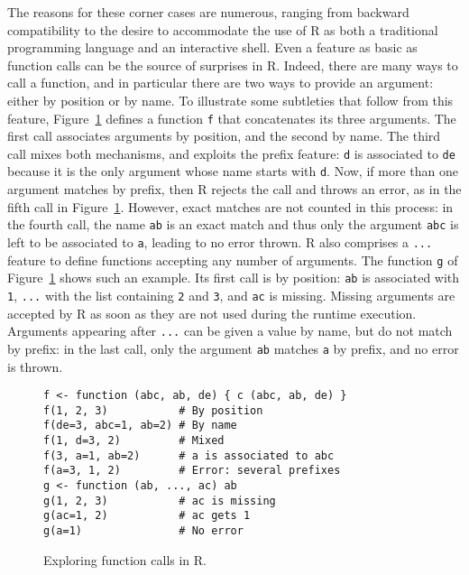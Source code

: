 \documentclass[
    sigplan,
    10pt,
    review, %
    natbib=false %
 ]{acmart}
\newcommand\newtext[1]{{\color{blue} #1}}
\begin{document}
The reasons for these corner cases are numerous, ranging from backward compatibility to the desire to accommodate the use of R as both a traditional programming language and an interactive shell.
Even a feature as basic as function calls can be the source of surprises in R.
Indeed, there are many ways to call a function, and in particular there are two ways to provide an argument: either by position or by name.%
%
To illustrate some subtleties that follow from this feature,
Figure~\ref{fig:calls} defines a function \texttt{f} that concatenates its three arguments. The first call associates arguments by position, and the second by name. The third call mixes both mechanisms, and exploits the prefix feature: \texttt{d} is associated to \texttt{de}
because it is the only argument whose name starts with \texttt{d}.
Now, if more than one argument matches by prefix,
then R rejects the call and throws an error,
as in the fifth call in Figure~\ref{fig:calls}.
However, exact matches are not counted in this process:
in the fourth call,
the name \texttt{ab} is an exact match
and thus only the argument \texttt{abc}
is left to be associated to \texttt{a},
leading to no error thrown.
%
\newtext{
R also comprises a \texttt{...} feature
to define functions accepting any number of arguments.
The function \texttt{g} of Figure~\ref{fig:calls}
shows such an example.
Its first call is by position:
\texttt{ab} is associated with \texttt{1},
\texttt{...} with the list containing \texttt{2} and \texttt{3},
and \texttt{ac} is missing.
Missing arguments are accepted by R
as soon as they are not used during the runtime execution.
Arguments appearing after \texttt{...}
can be given a value by name,
but do not match by prefix:
in the last call, only the argument \texttt{ab}
matches \texttt{a} by prefix,
and no error is thrown.}

\begin{figure}[t]
\begin{verbatim}
f <- function (abc, ab, de) { c (abc, ab, de) }
f(1, 2, 3)           # By position
f(de=3, abc=1, ab=2) # By name
f(1, d=3, 2)         # Mixed
f(3, a=1, ab=2)      # a is associated to abc
f(a=3, 1, 2)         # Error: several prefixes
g <- function (ab, ..., ac) ab
g(1, 2, 3)           # ac is missing
g(ac=1, 2)           # ac gets 1
g(a=1)               # No error
\end{verbatim}
\vspace{-1em}
\caption{Exploring function calls in R.}
\label{fig:calls}
\end{figure}
\end{document}
